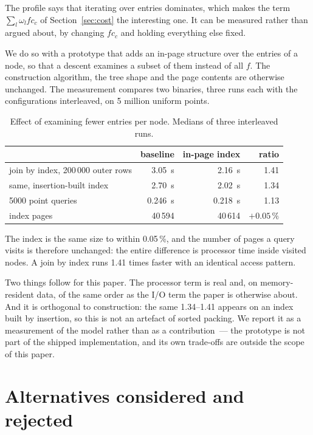 The profile says that iterating over entries dominates, which makes the term
$\sum_l \omega_l f c_c$ of Section~\ref{sec:cost} the interesting one. It can be
measured rather than argued about, by changing $f c_c$ and holding everything
else fixed.

We do so with a prototype that adds an in-page structure over the entries of a
node, so that a descent examines a subset of them instead of all $f$. The
construction algorithm, the tree shape and the page contents are otherwise
unchanged. The measurement compares two binaries, three runs each with the
configurations interleaved, on 5 million uniform points.

\begin{table}[t]
\centering
\caption{Effect of examining fewer entries per node. Medians of three
interleaved runs.}
\label{tab:cpudividend}
\begin{tabular}{lrrr}
\toprule
 & baseline & in-page index & ratio \\
\midrule
join by index, 200\,000 outer rows & 3.05~s & 2.16~s & 1.41 \\
same, insertion-built index & 2.70~s & 2.02~s & 1.34 \\
5000 point queries & 0.246~s & 0.218~s & 1.13 \\
index pages & 40\,594 & 40\,614 & $+0.05\,\%$ \\
\bottomrule
\end{tabular}
\end{table}

The index is the same size to within 0.05\,\%, and the number of pages a query
visits is therefore unchanged: the entire difference is processor time inside
visited nodes. A join by index runs 1.41 times faster with an identical access
pattern.

Two things follow for this paper. The processor term is real and, on
memory-resident data, of the same order as the I/O term the paper is otherwise
about. And it is orthogonal to construction: the same 1.34--1.41 appears on an
index built by insertion, so this is not an artefact of sorted packing. We
report it as a measurement of the model rather than as a contribution~--- the
prototype is not part of the shipped implementation, and its own trade-offs are
outside the scope of this paper.

\section{Alternatives considered and rejected}
\label{sec:rejected}

